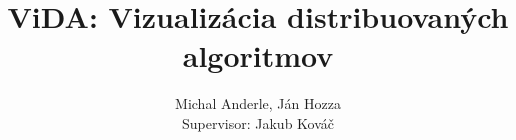 \documentclass[myposter,portrait]{sciposter}
\begin{document}
\setlength{\logowidth}{17cm}
\setlength{\titlewidth}{\textwidth}
\addtolength{\titlewidth}{-\logowidth}
\useleftlogofalse

\color{textCol}

\title{ViDA: Vizualizácia distribuovaných algoritmov}
\author{Michal Anderle, Ján Hozza\\
        Supervisor: Jakub Kováč}
\maketitle

\begin{multicols*}{3}








\end{multicols*}
\end{document}
